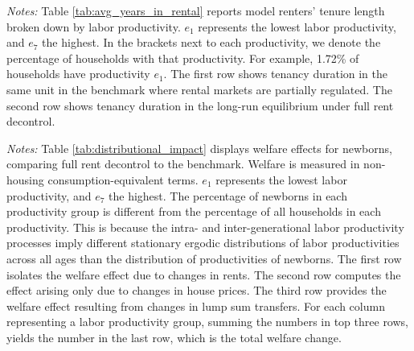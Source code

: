 \documentclass[parskip=full]{article}
\newenvironment{fignote2}[1]
{
\par
\medskip
\begin{minipage}{#1}
\footnotesize
}
{
\end{minipage}
}
\begin{document}
\begin{table}[H]
    \centering
    \caption{Avg. years in same rental unit by labor productivity for all renters}
    \vspace{-0.5cm}
    \label{tab:avg_years_in_rental}
    
    \vspace{-0.45cm}
    \begin{fignote2}{1.04\textwidth}
      \textit{Notes:} Table \ref{tab:avg_years_in_rental} reports model renters' tenure length broken down by labor productivity. $e_{1}$ represents the lowest labor productivity, and $e_{7}$ the highest. In the brackets next to each productivity, we denote the percentage of households with that productivity. For example, 1.72\% of households have productivity $e_{1}$. The first row shows tenancy duration in the same unit in the benchmark where rental markets are partially regulated. The second row shows tenancy duration in the long-run equilibrium under full rent decontrol.
    \end{fignote2}
\end{table}

\begin{table}[H]
    \centering
    \caption{Newborns' welfare gains and losses by labor productivity}
    \vspace{-0.5cm}
    \label{tab:distributional_impact}
    
    \vspace{-0.45cm}
    \begin{fignote2}{0.95\textwidth}
      \textit{Notes:} Table \ref{tab:distributional_impact} displays welfare effects for newborns, comparing full rent decontrol to the benchmark. Welfare is measured in non-housing consumption-equivalent terms. $e_{1}$ represents the lowest labor productivity, and $e_{7}$ the highest. The percentage of newborns in each productivity group is different from the percentage of all households in each productivity. This is because the intra- and inter-generational labor productivity processes imply different stationary ergodic distributions of labor productivities across all ages than the distribution of productivities of newborns. The first row isolates the welfare effect due to changes in rents. The second row computes the effect arising only due to changes in house prices. The third row provides the welfare effect resulting from changes in lump sum transfers. For each column representing a labor productivity group, summing the numbers in top three rows, yields the number in the last row, which is the total welfare change.
    \end{fignote2}
\end{table}
\end{document}
